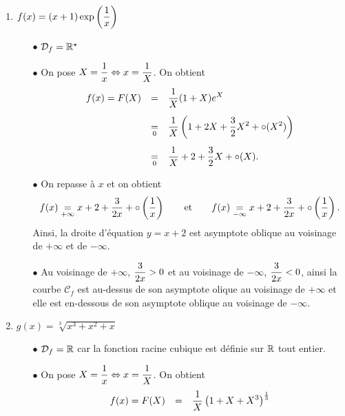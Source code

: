 \documentclass[a4paper, 11pt,reqno]{article}
\begin{document}
\begin{correction}  \;
	\begin{enumerate}
		\item $f(x)=(x+1)\exp{\left( \ddp\frac{1}{x} \right)}$
		      \begin{itemize}
			      \item[$\bullet$] $\mathcal{D}_f=\R^\star$
			      \item[$\bullet$]  On pose $X=\ddp\frac{1}{x}\Leftrightarrow x= \ddp\frac{1}{X}$. On obtient
			            $$\begin{array}{lll}
					            f(x)=F(X) & =               & \ddp\frac{1}{X}(1+X)e^X\vsec                                           \\
					                      & \underset{0}{=} & \ddp\frac{1}{X}\left(1+2X+\ddp\frac{3}{2}X^2+\circ(X^2)   \right)\vsec \\
					                      & \underset{0}{=} & \ddp\frac{1}{X}+2+\ddp\frac{3}{2}X+\circ (X).
				            \end{array}$$
			      \item[$\bullet$]  On repasse \`a $x$ et on obtient
			            $$ f(x)\underset{+\infty}{=} x+2+\ddp\frac{3}{2x}+\circ\left(\ddp\frac{1}{x} \right)\qquad \hbox{et}\qquad f(x)\underset{-\infty}{=} x+2+\ddp\frac{3}{2x}+\circ\left(\ddp\frac{1}{x} \right).$$
			            Ainsi, la droite d'\'equation $y=x+2$ est asymptote oblique au voisinage de $+\infty$ et de $-\infty$.
			      \item[$\bullet$]  Au voisinage de $+\infty$, $\ddp\frac{3}{2x}>0$ et au voisinage de $-\infty$, $\ddp\frac{3}{2x}<0$, ainsi la courbe $\mathcal{C}_f$ est au-dessus de son asymptote olique au voisinage de $+\infty$ et elle est en-dessous de son asymptote oblique au voisinage de $-\infty$.
		      \end{itemize}
		\item $g(x)=\sqrt[3]{x^3+x^2+x}$
		      \begin{itemize}
			      \item[$\bullet$] $\mathcal{D}_f=\R$ car la fonction racine cubique est d\'efinie sur $\R$ tout entier.
			      \item[$\bullet$]  On pose $X=\ddp\frac{1}{x}\Leftrightarrow x= \ddp\frac{1}{X}$. On obtient
			            $$\begin{array}{lll}
					            f(x)=F(X) & =               & \ddp\frac{1}{X}\left( 1+X+X^3\right)^{\frac{1}{3}}\vsec                            \\

\end{array}$$
\end{itemize}
\end{enumerate}
\end{correction}
\end{document}

